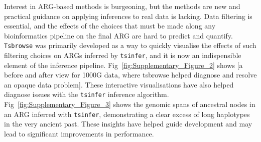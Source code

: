 \documentclass[unnumsec,webpdf,contemporary,large,namedate]{oup-authoring-template}%
\begin{document}
Interest in ARG-based methods is burgeoning, but the methods are new 
and practical guidance on applying inferences to real data is lacking.
Data filtering is essential, and the effects of the 
choices that must be made along any bioinformatics pipeline on the final
ARG are hard to predict and quantify. \texttt{Tsbrowse} was primarily
developed as a way to quickly visualise the effects of such filtering
choices on ARGs inferred by \texttt{tsinfer}, and it is now an indispensible
element of the inference pipeline. Fig~\ref{fig:Supplementary_Figure_2} 
shows [a before and after view for 1000G data, where tsbrowse helped 
diagnose and resolve an opaque data problem].
These interactive visualisations have also helped diagnose issues with
the \texttt{tsinfer} inference algorithm. 
Fig~\ref{fig:Supplementary_Figure_3} shows the genomic spans of 
ancestral nodes in an ARG inferred with \texttt{tsinfer}, demonstrating a clear 
excess of long haplotypes in the very ancient past. These insights 
have helped guide development and 
may lead to significant improvements in performance.



\end{document}

